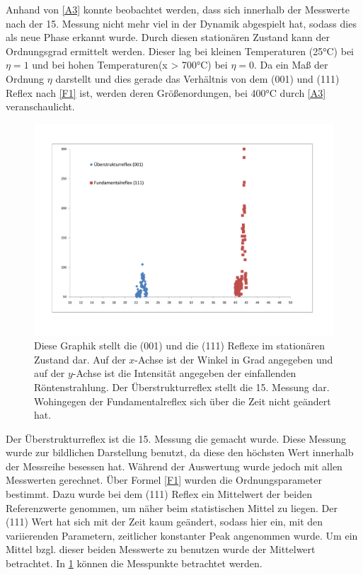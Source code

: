 \documentclass[
	a4paper,
	12pt,
	pagesize,
	ngerman
]{scrartcl}
\begin{document}
Anhand von \cref{A3} konnte beobachtet werden, dass sich innerhalb der Messwerte nach der 15. Messung nicht mehr viel in der Dynamik abgespielt hat, sodass dies als neue Phase erkannt wurde. Durch diesen stationären Zustand kann der Ordnungsgrad ermittelt werden. Dieser lag bei kleinen Temperaturen (25°C) bei $\eta = 1$ und bei hohen Temperaturen(x > 700°C) bei $\eta = 0$. Da ein Maß der Ordnung $\eta$ darstellt und dies gerade das Verhältnis von dem (001) und (111) Reflex nach \cref{F1} ist, werden deren Größenordungen, bei 400°C durch \cref{A3} veranschaulicht.
\begin{figure}[h!]
    \centering
    \includegraphics[scale = 0.6]{001 und 111.pdf}
    \caption{Diese Graphik stellt die (001) und die (111) Reflexe im stationären Zustand dar. Auf der $x$-Achse ist der Winkel in Grad angegeben und auf der $y$-Achse ist die Intensität angegeben der einfallenden Röntenstrahlung. Der Überstrukturreflex stellt die 15. Messung dar. Wohingegen der Fundamentalreflex sich über die Zeit nicht geändert hat.}
    \label{A4}
\end{figure}
Der Überstrukturreflex ist die 15. Messung die gemacht wurde. Diese Messung wurde zur bildlichen Darstellung benutzt, da diese den höchsten Wert innerhalb der Messreihe besessen hat. Während der Auswertung wurde jedoch mit allen Messwerten gerechnet.
Über Formel \cref{F1} wurden die Ordnungsparameter bestimmt. Dazu wurde bei dem (111) Reflex ein Mittelwert der beiden Referenzwerte genommen, um näher beim statistischen Mittel zu liegen. Der (111) Wert hat sich mit der Zeit kaum geändert, sodass hier ein, mit den variierenden Parametern, zeitlicher konstanter Peak angenommen wurde. Um ein Mittel bzgl. dieser beiden Messwerte zu benutzen wurde der Mittelwert betrachtet. In \cref{A4} können die Messpunkte betrachtet werden. 
\end{document}
